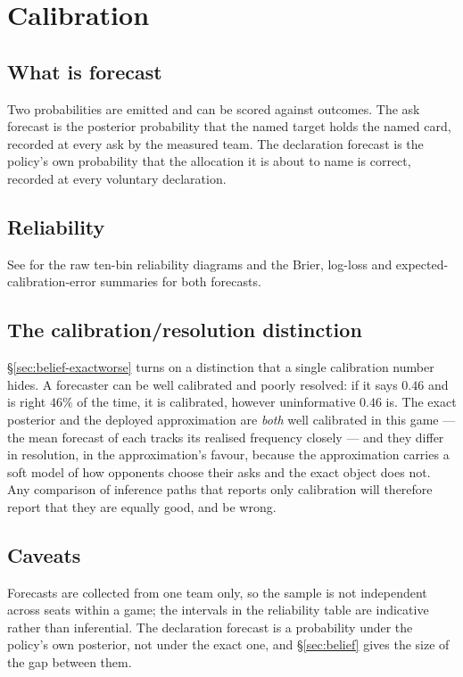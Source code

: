 \section{Calibration}
\label{app:calibration}

\subsection{What is forecast}
\label{app:calib-ask}

Two probabilities are emitted and can be scored against outcomes. The ask forecast is the
posterior probability that the named target holds the named card, recorded at every ask by the
measured team. The declaration forecast is the policy's own probability that the allocation it is
about to name is correct, recorded at every voluntary declaration.

\subsection{Reliability}
\label{app:calib-decl}

See  for the raw ten-bin reliability diagrams and
the Brier, log-loss and expected-calibration-error summaries for both forecasts.

\subsection{The calibration/resolution distinction}
\label{app:calib-versions}

\S\ref{sec:belief-exactworse} turns on a distinction that a single calibration number hides. A
forecaster can be well calibrated and poorly resolved: if it says $0.46$ and is right $46\%$ of the
time, it is calibrated, however uninformative $0.46$ is. The exact posterior and the deployed
approximation are \emph{both} well calibrated in this game --- the mean forecast of each tracks its
realised frequency closely --- and they differ in resolution, in the approximation's favour, because
the approximation carries a soft model of how opponents choose their asks and the exact object does
not. Any comparison of inference paths that reports only calibration will therefore report that they
are equally good, and be wrong.

\subsection{Caveats}
\label{app:calib-caveats}

Forecasts are collected from one team only, so the sample is not independent across seats within a
game; the intervals in the reliability table are indicative rather than inferential. The declaration
forecast is a probability under the policy's own posterior, not under the exact one, and
\S\ref{sec:belief} gives the size of the gap between them.
